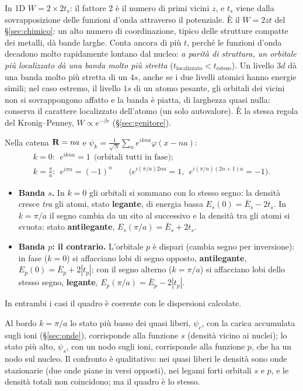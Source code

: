 \documentclass[11pt,a4paper]{article}
\begin{document}
In 1D $W=2\times2t_s$: il fattore 2 è il numero di primi vicini $z$, e $t_s$ viene dalla sovrapposizione delle funzioni d'onda attraverso il potenziale.
È il $W=2zt$ del §\ref{sec:chimico}: un alto numero di coordinazione, tipico delle strutture compatte dei metalli, dà bande larghe. Conta ancora di più
$t$, perché le funzioni d'onda decadono molto rapidamente lontano dal nucleo: \emph{a parità di struttura, un orbitale più localizzato dà una banda
molto più stretta} ($t_{\text{localizzato}}<t_{\text{esteso}}$). Un livello $3d$ dà una banda molto più stretta di un $4s$, anche se i due livelli atomici
hanno energie simili; nel caso estremo, il livello $1s$ di un atomo pesante, gli orbitali dei vicini non si sovrappongono affatto e la banda è piatta, di
larghezza quasi nulla: conserva il carattere localizzato dell'atomo (un solo autovalore). È la stessa regola del Kronig--Penney, $W\propto e^{-\beta c}$
(§\ref{sec:genitore}).

Nella catena $\mathbf R=na$ e $\psi_k=\frac1{\sqrt N}\sum_ne^{ikna}\varphi(x-na)$:
\begin{gather*}
k=0:\ \ e^{ikna}=1\ \ \text{(orbitali tutti in fase)};\\
k=\frac\pi a:\ \ e^{i\pi n}=(-1)^n\qquad\bigl(e^{i(\pi/a)2na}=1,\ \ e^{i(\pi/a)(2n+1)a}=-1\bigr).
\end{gather*}
\begin{itemize}[leftmargin=*]
\item \textbf{Banda $s$.} In $k=0$ gli orbitali si sommano con lo stesso segno: la densità cresce \emph{tra} gli atomi, stato \textbf{legante}, di
energia bassa $E_s(0)=\bar E_s-2t_s$. In $k=\pi/a$ il segno cambia da un sito al successivo e la densità tra gli atomi si svuota: stato
\textbf{antilegante}, $E_s(\pi/a)=\bar E_s+2t_s$.
\item \textbf{Banda $p$: il contrario.} L'orbitale $p$ è dispari (cambia segno per inversione): in fase ($k=0$) si affacciano lobi di segno opposto,
\textbf{antilegante}, $E_p(0)=\bar E_p+2|t_p|$; con il segno alterno ($k=\pi/a$) si affacciano lobi dello stesso segno, \textbf{legante},
$E_p(\pi/a)=\bar E_p-2|t_p|$.
\end{itemize}
In entrambi i casi il quadro è coerente con le dispersioni calcolate.

Al bordo $k=\pi/a$ lo stato più basso dei quasi liberi, $\psi_c$, con la carica accumulata sugli ioni (§\ref{sec:onde}), corrisponde alla funzione $s$
(densità vicino ai nuclei); lo stato più alto, $\psi_s$, con un nodo sugli ioni, corrisponde alla funzione $p$, che ha un nodo sul nucleo. Il confronto è
qualitativo: nei quasi liberi le densità sono onde stazionarie (due onde piane in versi opposti), nei legami forti orbitali $s$ e $p$, e le densità
totali non coincidono; ma il quadro è lo stesso.
\end{document}

